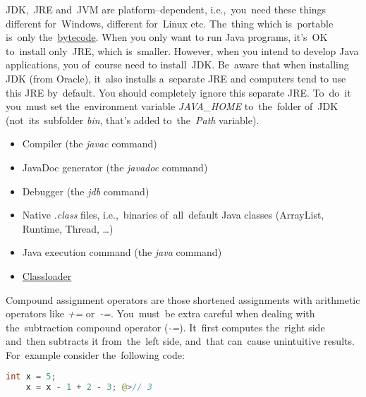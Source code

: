 \noindent JDK,~JRE and~JVM are platform--dependent, i.e.,~you~need these things different for~Windows, different for~Linux etc. The~thing which is~portable is~only the~\hyperref[bytecode]{bytecode}. When you only want to run Java programs, it's~OK to~install only~JRE, which is~smaller. However, when you intend to develop Java applications, you of~course need to install~JDK. Be~aware that when installing JDK (from Oracle), it~also installs a~separate JRE and computers tend to use this JRE by~default. You should completely ignore this separate JRE. To~do~it you~must set the~environment variable \textit{JAVA\_HOME} to~the~folder of~JDK (not~its~subfolder \textit{bin}, that's added to~the~\textit{Path} variable).

\begin{itemize}
    \item Compiler (the \textit{javac} command)
    \item JavaDoc generator (the \textit{javadoc} command)
    \item Debugger (the \textit{jdb} command)
\end{itemize}

\begin{itemize}
    \item Native \textit{.class} files, i.e.,~binaries of~all~default Java classes (ArrayList, Runtime, Thread, \dots)
    \item Java execution command (the \textit{java} command)
    \item \hyperref[classloaders]{Classloader}
\end{itemize}

\label{javadatatypes}

\label{accessmodifiers}

Compound assignment operators are those shortened assignments with arithmetic operators like \mbox{\textquotesingle\textit{+=}\textquotesingle} or~\mbox{\textquotesingle\textit{-=}\textquotesingle}. You~must~be extra careful when dealing with the~subtraction compound operator (\mbox{\textquotesingle\textit{-=}\textquotesingle}). It~first computes the~right side and~then subtracts it from~the~left side, and~that can~cause unintuitive results. For~example consider the~following code:
\begin{lstlisting}[language=Java, frame=no]
    int x = 5;
    x = x - 1 + 2 - 3; @>// 3
\end{lstlisting}

